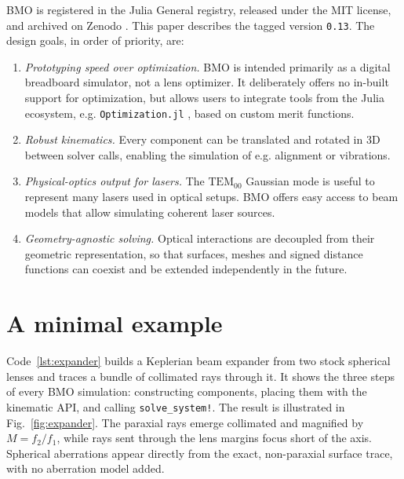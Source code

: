 \documentclass{juliacon}
\begin{document}
BMO is registered in the Julia General registry, released under the MIT
license, and archived on Zenodo \cite{BeamletOptics_zenodo}. This paper
describes the tagged version \texttt{0.13}. The design goals, in order
of priority, are:
\begin{enumerate}
  \item \emph{Prototyping speed over optimization.} BMO is intended
  primarily as a digital
breadboard simulator, not a lens optimizer. It deliberately offers no
in-built support for optimization, but allows users to integrate tools
from the Julia ecosystem, e.g. \texttt{Optimization.jl}
\cite{Optimization_jl}, based on custom merit functions.
  \item \emph{Robust kinematics.} Every component can be translated and
rotated in 3D between solver calls, enabling the simulation of e.g.
alignment or vibrations.
  \item \emph{Physical-optics output for lasers.} The $\mathrm{TEM}_{00}$
Gaussian mode is useful to represent many lasers used in optical setups.
BMO offers easy access to beam models that allow simulating coherent
laser sources.
  \item \emph{Geometry-agnostic solving.} Optical interactions are
decoupled from their geometric representation, so that surfaces, meshes
and signed distance functions can coexist and be extended independently
in the future.
\end{enumerate}

\section{A minimal example}

Code~\ref{lst:expander} builds a Keplerian beam expander from two stock
spherical lenses and traces a bundle of collimated rays through it. It
shows the three steps of every BMO simulation: constructing
components, placing them with the kinematic API, and calling
\texttt{solve\_system!}. The result is illustrated in
Fig.~\ref{fig:expander}. The paraxial rays emerge collimated and
magnified by $M = f_2/f_1$, while rays sent through the lens margins
focus short of the axis. Spherical aberrations appear directly from the
exact, non-paraxial surface trace, with no aberration model added.
\end{document}
